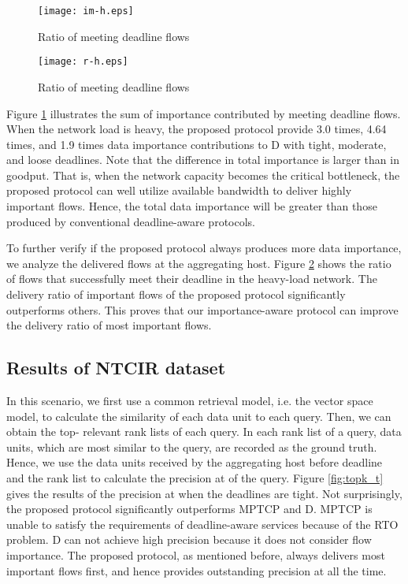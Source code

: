 \documentclass[conference]{IEEEtran}
\begin{document}
\begin{figure}
  \centering
  \texttt{[image: im-h.eps]}\\
  \caption{Ratio of meeting deadline flows}\label{fig:im}
\end{figure}

\begin{figure}
  \centering
  \texttt{[image: r-h.eps]}\\
  \caption{Ratio of meeting deadline flows}\label{fig:ratio}
\end{figure}

Figure \ref{fig:im} illustrates the sum of importance contributed by meeting deadline flows. When the network load is heavy, the proposed protocol provide 3.0 times, 4.64 times, and 1.9 times data importance contributions to D with tight, moderate, and loose deadlines. Note that the difference in total importance is larger than in goodput. That is, when the network capacity becomes the critical bottleneck, the proposed protocol can well utilize available bandwidth to deliver highly important flows. Hence, the total data importance will be greater than those produced by conventional deadline-aware protocols.

To further verify if the proposed protocol always produces more data importance, we analyze the delivered flows at the aggregating host. Figure \ref{fig:ratio} shows the ratio of flows that successfully meet their deadline in the heavy-load network. The delivery ratio of important flows of the proposed protocol significantly outperforms others. This proves that our importance-aware protocol can improve the delivery ratio of most important flows.




\subsection{Results of NTCIR dataset}

In this scenario, we first use a common retrieval model, i.e. the vector space model, to calculate the similarity of each data unit to each query. Then, we can obtain the top- relevant rank lists of each query. In each rank list of a query,  data units, which are most similar to the query, are recorded as the ground truth. Hence, we use the data units received by the aggregating host before deadline and the rank list to calculate the precision at  of the query. Figure \ref{fig:topk_t} gives the results of the precision at  when the deadlines are tight. Not surprisingly, the proposed protocol significantly outperforms MPTCP and D. MPTCP is unable to satisfy the requirements of deadline-aware services because of the RTO problem. D can not achieve high precision because it does not consider flow importance. The proposed protocol, as mentioned before, always delivers most important flows first, and hence provides outstanding precision at  all the time.
\end{document}
